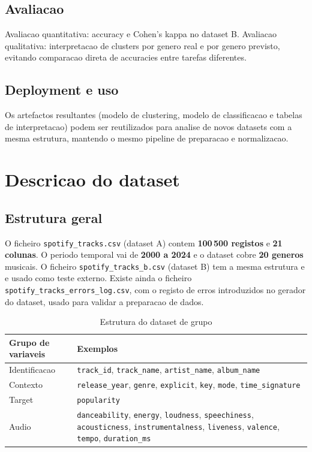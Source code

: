 \documentclass[11pt,a4paper]{article}
\begin{document}
\subsection{Avaliacao}
Avaliacao quantitativa: accuracy e Cohen's kappa no dataset B. Avaliacao qualitativa: interpretacao de clusters por genero real e por genero previsto, evitando comparacao direta de accuracies entre tarefas diferentes.

\subsection{Deployment e uso}
Os artefactos resultantes (modelo de clustering, modelo de classificacao e tabelas de interpretacao) podem ser reutilizados para analise de novos datasets com a mesma estrutura, mantendo o mesmo pipeline de preparacao e normalizacao.

\section{Descricao do dataset}
\subsection{Estrutura geral}
O ficheiro \texttt{spotify\_tracks.csv} (dataset A) contem \textbf{100\,500 registos} e \textbf{21 colunas}. O periodo temporal vai de \textbf{2000 a 2024} e o dataset cobre \textbf{20 generos} musicais. O ficheiro \texttt{spotify\_tracks\_b.csv} (dataset B) tem a mesma estrutura e e usado como teste externo. Existe ainda o ficheiro \texttt{spotify\_tracks\_errors\_log.csv}, com o registo de erros introduzidos no gerador do dataset, usado para validar a preparacao de dados.

\begin{table}[H]
\centering
\caption{Estrutura do dataset de grupo}
\begin{tabular}{p{4cm}p{10cm}}
\toprule
Grupo de variaveis & Exemplos \\
\midrule
Identificacao & \texttt{track\_id}, \texttt{track\_name}, \texttt{artist\_name}, \texttt{album\_name} \\
Contexto & \texttt{release\_year}, \texttt{genre}, \texttt{explicit}, \texttt{key}, \texttt{mode}, \texttt{time\_signature} \\
Target & \texttt{popularity} \\
Audio & \texttt{danceability}, \texttt{energy}, \texttt{loudness}, \texttt{speechiness}, \texttt{acousticness}, \texttt{instrumentalness}, \texttt{liveness}, \texttt{valence}, \texttt{tempo}, \texttt{duration\_ms} \\
\bottomrule
\end{tabular}
\end{table}
\end{document}
